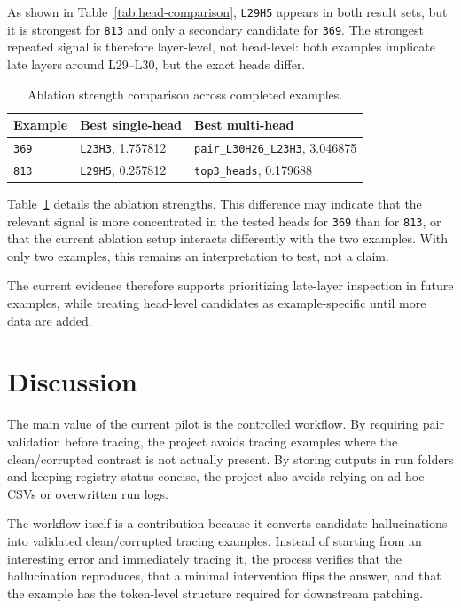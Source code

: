 \documentclass[11pt]{article}
\begin{document}
As shown in Table~\ref{tab:head-comparison}, \texttt{L29H5} appears in both result sets, but it is strongest for \texttt{813} and only a secondary candidate for \texttt{369}. The strongest repeated signal is therefore layer-level, not head-level: both examples implicate late layers around L29--L30, but the exact heads differ.


\begin{table}[t]
\caption{Ablation strength comparison across completed examples.}
\centering
\small
\begin{tabular}{lll}
\toprule
\textbf{Example} & \textbf{Best single-head} & \textbf{Best multi-head} \\
\midrule
\texttt{369} & \texttt{L23H3}, 1.757812 & \texttt{pair\_L30H26\_L23H3}, 3.046875 \\
\texttt{813} & \texttt{L29H5}, 0.257812 & \texttt{top3\_heads}, 0.179688 \\
\bottomrule
\end{tabular}

\label{tab:ablation-comparison}
\end{table}

 Table~\ref{tab:ablation-comparison} details the ablation strengths. This difference may indicate that the relevant signal is more concentrated in the tested heads for \texttt{369} than for \texttt{813}, or that the current ablation setup interacts differently with the two examples. With only two examples, this remains an interpretation to test, not a claim.

The current evidence therefore supports prioritizing late-layer inspection in future examples, while treating head-level candidates as example-specific until more data are added.

\section{Discussion}

The main value of the current pilot is the controlled workflow. By requiring pair validation before tracing, the project avoids tracing examples where the clean/corrupted contrast is not actually present. By storing outputs in run folders and keeping registry status concise, the project also avoids relying on ad hoc CSVs or overwritten run logs.

The workflow itself is a contribution because it converts candidate hallucinations into validated clean/corrupted tracing examples. Instead of starting from an interesting error and immediately tracing it, the process verifies that the hallucination reproduces, that a minimal intervention flips the answer, and that the example has the token-level structure required for downstream patching.
\end{document}
